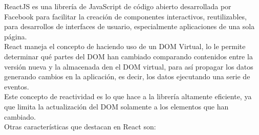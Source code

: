 ReactJS es una librería de JavaScript de código abierto desarrollada por Facebook para facilitar la creación de componentes interactivos, reutilizables, para desarrollos de interfaces de usuario, especialmente aplicaciones de una sola página.\\

React maneja el concepto de  haciendo uso de un DOM Virtual, lo le permite determinar qué partes del DOM han cambiado comparando contenidos entre la versión nueva y la almacenada den el DOM virtual, para así propagar los datos generando cambios en la aplicación, es decir, los datos  ejecutando una serie de eventos.\\

Este concepto de reactividad es lo que hace a la librería altamente eficiente, ya que limita la actualización del DOM solamente a los elementos que han cambiado.\\

Otras características que destacan en React son:\\

